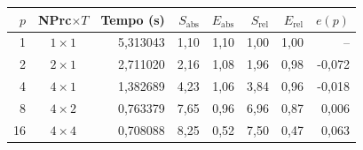 \begin{tabular}{@{}rcrrrrrr@{}}
\toprule
$p$ & NPrc${\times}T$ & Tempo (s) & $S_\text{abs}$ & $E_\text{abs}$ & $S_\text{rel}$ & $E_\text{rel}$ & $e(p)$ \\
\midrule
1 & $1{\times}1$ & 5{,}313043 & 1{,}10 & 1{,}10 & 1{,}00 & 1{,}00 & -- \\
2 & $2{\times}1$ & 2{,}711020 & 2{,}16 & 1{,}08 & 1{,}96 & 0{,}98 & -0{,}072 \\
4 & $4{\times}1$ & 1{,}382689 & 4{,}23 & 1{,}06 & 3{,}84 & 0{,}96 & -0{,}018 \\
8 & $4{\times}2$ & 0{,}763379 & 7{,}65 & 0{,}96 & 6{,}96 & 0{,}87 & 0{,}006 \\
16 & $4{\times}4$ & 0{,}708088 & 8{,}25 & 0{,}52 & 7{,}50 & 0{,}47 & 0{,}063 \\
\bottomrule
\end{tabular}
